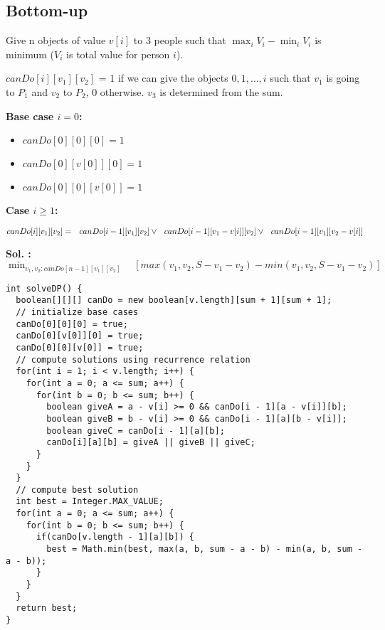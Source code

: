 \subsection{Bottom-up}
Give n objects of value $v[i]$ to 3 people such that $\max_i V_i - \min_i V_i$ is minimum ($V_i$ is total value for person $i$).

$canDo[i][v_1][v_2]$ =  1 if we can give the objects $0, 1, \ldots, i$ such that $v_1$ is going to $P_1$ and $v_2$ to $P_2$, 0 otherwise. $v_3$ is determined from the sum.

\begin{minipage}{0.25\textwidth}
\textbf{Base case $i = 0$:}
\begin{itemize}
\item $ canDo[0][0][0]  = 1$
\item $ canDo[0][v[0]][0]  = 1$ 
\item $ canDo[0][0][v[0]]  = 1$
\end{itemize}
\end{minipage}
\begin{minipage}{0.25\textwidth}
\textbf{Case $i \geq 1$:} 

$ canDo[i][v_1][v_2] =  \\\text{\ \ }canDo[i - 1][v_1][v_2] \vee \\  \text{\ \ }canDo[i - 1][v_1 - v[i]][v_2] \vee \\  \text{\ \ } canDo[i - 1][v_1][v_2 - v[i]] $
\end{minipage}
\newline
\textbf{Sol. :} $ \min_{v_1, v_2 : canDo[n - 1][v_1][v_2]} \quad [max(v_1, v_2, S - v_1 - v_2) - min(v_1, v_2, S - v_1 - v_2)]$
\newline
\begin{lstlisting}
int solveDP() {
  boolean[][][] canDo = new boolean[v.length][sum + 1][sum + 1];
  // initialize base cases
  canDo[0][0][0] = true;
  canDo[0][v[0]][0] = true;
  canDo[0][0][v[0]] = true;
  // compute solutions using recurrence relation
  for(int i = 1; i < v.length; i++) {
    for(int a = 0; a <= sum; a++) {
      for(int b = 0; b <= sum; b++) {
        boolean giveA = a - v[i] >= 0 && canDo[i - 1][a - v[i]][b];
        boolean giveB = b - v[i] >= 0 && canDo[i - 1][a][b - v[i]];
        boolean giveC = canDo[i - 1][a][b];
        canDo[i][a][b] = giveA || giveB || giveC;
      }
    }
  }
  // compute best solution
  int best = Integer.MAX_VALUE;
  for(int a = 0; a <= sum; a++) {
    for(int b = 0; b <= sum; b++) {
      if(canDo[v.length - 1][a][b]) {
        best = Math.min(best, max(a, b, sum - a - b) - min(a, b, sum - a - b));
      }
    }
  }
  return best;
}
\end{lstlisting}